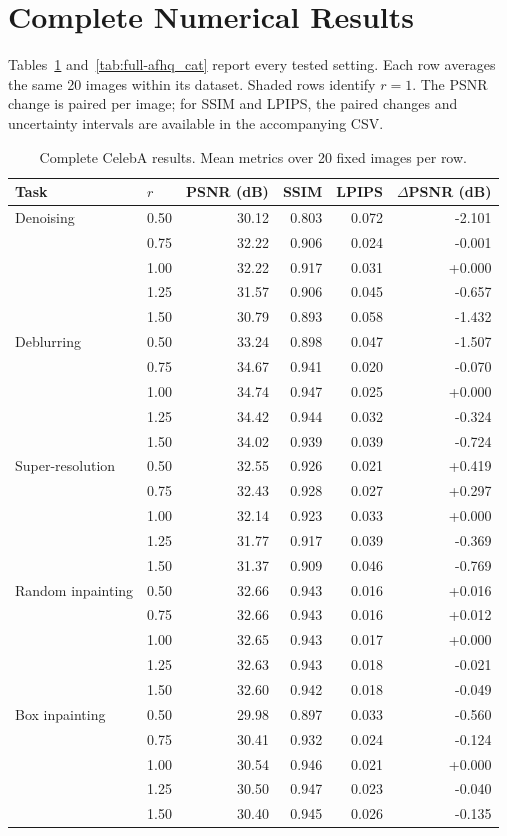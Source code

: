 \documentclass[10pt,letterpaper]{article}
\begin{document}
\section{Complete Numerical Results}\label{app:full}
Tables~\ref{tab:full-celeba} and~\ref{tab:full-afhq_cat} report every tested setting. Each row averages the same 20 images within its dataset. Shaded rows identify $r=1$. The PSNR change is paired per image; for SSIM and LPIPS, the paired changes and uncertainty intervals are available in the accompanying CSV.
\begin{table}[p]\centering\small
\caption{Complete CelebA results. Mean metrics over 20 fixed images per row.}
\label{tab:full-celeba}
\begin{tabular}{llrrrr}
\toprule
Task & $r$ & PSNR (dB) & SSIM & LPIPS & $\Delta$PSNR (dB)\\
\midrule
Denoising & 0.50 & 30.12 & 0.803 & 0.072 & -2.101\\
 & 0.75 & 32.22 & 0.906 & 0.024 & -0.001\\
\rowcolor{control}
 & 1.00 & 32.22 & 0.917 & 0.031 & +0.000\\
 & 1.25 & 31.57 & 0.906 & 0.045 & -0.657\\
 & 1.50 & 30.79 & 0.893 & 0.058 & -1.432\\
\midrule
Deblurring & 0.50 & 33.24 & 0.898 & 0.047 & -1.507\\
 & 0.75 & 34.67 & 0.941 & 0.020 & -0.070\\
\rowcolor{control}
 & 1.00 & 34.74 & 0.947 & 0.025 & +0.000\\
 & 1.25 & 34.42 & 0.944 & 0.032 & -0.324\\
 & 1.50 & 34.02 & 0.939 & 0.039 & -0.724\\
\midrule
Super-resolution & 0.50 & 32.55 & 0.926 & 0.021 & +0.419\\
 & 0.75 & 32.43 & 0.928 & 0.027 & +0.297\\
\rowcolor{control}
 & 1.00 & 32.14 & 0.923 & 0.033 & +0.000\\
 & 1.25 & 31.77 & 0.917 & 0.039 & -0.369\\
 & 1.50 & 31.37 & 0.909 & 0.046 & -0.769\\
\midrule
Random inpainting & 0.50 & 32.66 & 0.943 & 0.016 & +0.016\\
 & 0.75 & 32.66 & 0.943 & 0.016 & +0.012\\
\rowcolor{control}
 & 1.00 & 32.65 & 0.943 & 0.017 & +0.000\\
 & 1.25 & 32.63 & 0.943 & 0.018 & -0.021\\
 & 1.50 & 32.60 & 0.942 & 0.018 & -0.049\\
\midrule
Box inpainting & 0.50 & 29.98 & 0.897 & 0.033 & -0.560\\
 & 0.75 & 30.41 & 0.932 & 0.024 & -0.124\\
\rowcolor{control}
 & 1.00 & 30.54 & 0.946 & 0.021 & +0.000\\
 & 1.25 & 30.50 & 0.947 & 0.023 & -0.040\\
 & 1.50 & 30.40 & 0.945 & 0.026 & -0.135\\
\bottomrule
\end{tabular}
\end{table}
\end{document}
